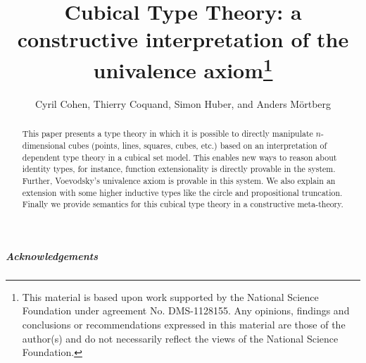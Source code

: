 \documentclass[10pt,a4paper,utf8]{article}
\theoremstyle{plain}
\theoremstyle{definition}
\theoremstyle{remark}
\begin{document}
\title{Cubical Type Theory: a constructive interpretation of the
  univalence axiom\footnote{This material is based upon work supported
    by the National Science Foundation under agreement
    No. DMS-1128155. Any opinions, findings and conclusions or
    recommendations expressed in this material are those of the
    author(s) and do not necessarily reflect the views of the National
    Science Foundation.}}

\author{Cyril Cohen, Thierry Coquand, Simon Huber, and Anders Mörtberg}

\date{}

\maketitle

\begin{abstract}
  This paper presents a type theory in which it is possible to
  directly manipulate $n$-dimensional cubes (points, lines, squares,
  cubes, etc.) based on an interpretation of dependent type theory in
  a cubical set model. This enables new ways to reason about identity
  types, for instance, function extensionality is directly provable in
  the system. Further, Voevodsky's univalence axiom is provable in
  this system. We also explain an extension with some higher inductive
  types like the circle and propositional truncation. Finally we
  provide semantics for this cubical type theory in a constructive
  meta-theory.
\end{abstract}

\tableofcontents



\subparagraph*{Acknowledgements}
\end{document}
